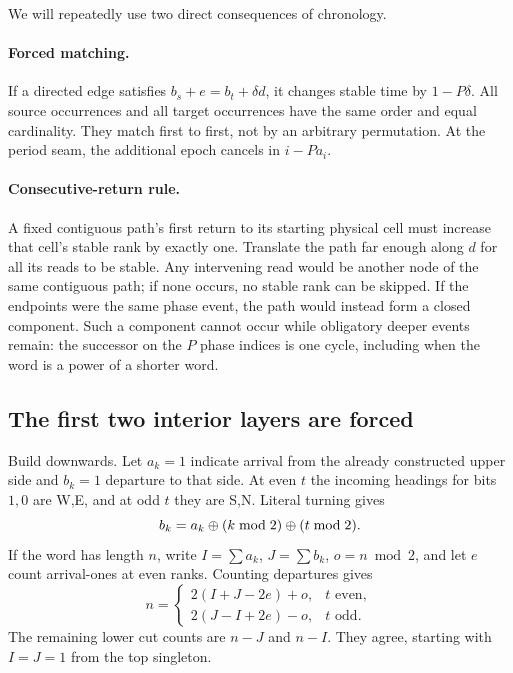 We will repeatedly use two direct consequences of chronology.

\paragraph{Forced matching.}
If a directed edge satisfies $b_s+e=b_t+\delta d$, it changes stable time by
$1-P\delta$. All source occurrences and all target occurrences have the same
order and equal cardinality. They match first to first, not by an arbitrary
permutation. At the period seam, the additional epoch cancels in $i-Pa_i$.

\paragraph{Consecutive-return rule.}
A fixed contiguous path's first return to its starting physical cell must
increase that cell's stable rank by exactly one. Translate the path far enough
along $d$ for all its reads to be stable. Any intervening read would be another
node of the same contiguous path; if none occurs, no stable rank can be skipped.
If the endpoints were the same phase event, the path would instead form a
closed component. Such a component cannot occur while obligatory deeper events
remain: the successor on the $P$ phase indices is one cycle, including when
the word is a power of a shorter word.

\subsection{The first two interior layers are forced}\label{ud:sec:forced}
Build downwards. Let $a_k=1$ indicate arrival from the already constructed
upper side and $b_k=1$ departure to that side. At even $t$ the incoming headings
for bits $1,0$ are W,E, and at odd $t$ they are S,N. Literal turning gives
\begin{equation}\label{ud:eq:port}
 b_k=a_k\mathbin{\oplus}(k\bmod2)\mathbin{\oplus}(t\bmod2).
\end{equation}
If the word has length $n$, write $I=\sum a_k$, $J=\sum b_k$, $o=n\bmod2$,
and let $e$ count arrival-ones at even ranks. Counting departures gives
\begin{equation}\label{ud:eq:count}
 n=\begin{cases}2(I+J-2e)+o,&t\text{ even},\\
                 2(J-I+2e)-o,&t\text{ odd}.
    \end{cases}
\end{equation}
The remaining lower cut counts are $n-J$ and $n-I$. They agree, starting
with $I=J=1$ from the top singleton.

